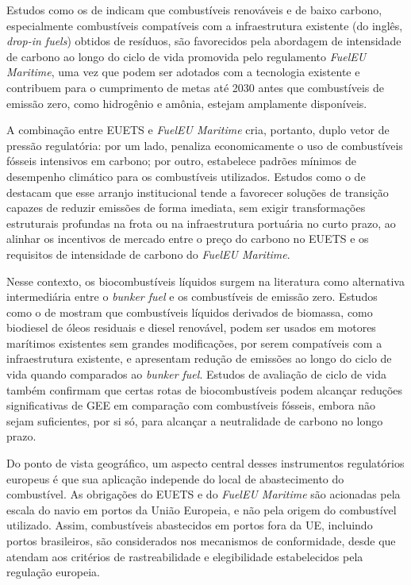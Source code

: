 Estudos como os de \citet{ce_delft_assessment_2020} indicam que combustíveis renováveis e de baixo carbono, especialmente combustíveis compatíveis com a infraestrutura existente (do inglês, \emph{drop-in fuels}) obtidos de resíduos, são favorecidos pela abordagem de intensidade de carbono ao longo do ciclo de vida promovida pelo regulamento \emph{FuelEU Maritime}, uma vez que podem ser adotados com a tecnologia existente e contribuem para o cumprimento de metas até 2030 antes que combustíveis de emissão zero, como hidrogênio e amônia, estejam amplamente disponíveis.

A combinação entre \gls{EUETS} e \emph{FuelEU Maritime} cria, portanto, duplo vetor de pressão regulatória: por um lado, penaliza economicamente o uso de combustíveis fósseis intensivos em carbono; por outro, estabelece padrões mínimos de desempenho climático para os combustíveis utilizados. Estudos como o de \citet{ce_delft_fueleu_2021} destacam que esse arranjo institucional tende a favorecer soluções de transição capazes de reduzir emissões de forma imediata, sem exigir transformações estruturais profundas na frota ou na infraestrutura portuária no curto prazo, ao alinhar os incentivos de mercado entre o preço do carbono no \gls{EUETS} e os requisitos de intensidade de carbono do \emph{FuelEU Maritime}.

Nesse contexto, os biocombustíveis líquidos surgem na literatura como alternativa intermediária entre o \emph{bunker fuel} e os combustíveis de emissão zero. Estudos como o de \citet{international_council_on_clean_transportation_potential_2021} mostram que combustíveis líquidos derivados de biomassa, como biodiesel de óleos residuais e diesel renovável, podem ser usados em motores marítimos existentes sem grandes modificações, por serem compatíveis com a infraestrutura existente, e apresentam redução de emissões ao longo do ciclo de vida quando comparados ao \emph{bunker fuel}. Estudos de avaliação de ciclo de vida também confirmam que certas rotas de biocombustíveis podem alcançar reduções significativas de \gls{GEE} em comparação com combustíveis fósseis, embora não sejam suficientes, por si só, para alcançar a neutralidade de carbono no longo prazo.

Do ponto de vista geográfico, um aspecto central desses instrumentos regulatórios europeus é que sua aplicação independe do local de abastecimento do combustível. As obrigações do \gls{EUETS} e do \emph{FuelEU Maritime} são acionadas pela escala do navio em portos da União Europeia, e não pela origem do combustível utilizado. Assim, combustíveis abastecidos em portos fora da UE, incluindo portos brasileiros, são considerados nos mecanismos de conformidade, desde que atendam aos critérios de rastreabilidade e elegibilidade estabelecidos pela regulação europeia.

